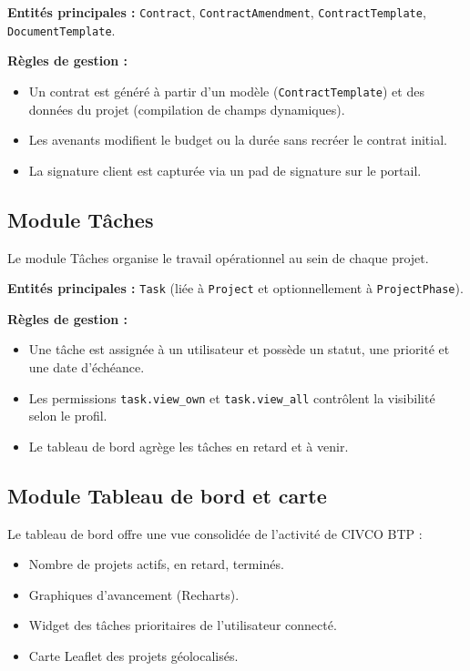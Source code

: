 \medskip

\textbf{Entités principales :} \texttt{Contract}, \texttt{ContractAmendment},
\texttt{ContractTemplate}, \texttt{DocumentTemplate}.

\medskip

\textbf{Règles de gestion :}
\begin{itemize}
  \item Un contrat est généré à partir d'un modèle (\texttt{ContractTemplate}) et
  des données du projet (compilation de champs dynamiques).
  \item Les avenants modifient le budget ou la durée sans recréer le contrat initial.
  \item La signature client est capturée via un pad de signature sur le portail.
\end{itemize}

\subsection{Module Tâches}

Le module Tâches organise le travail opérationnel au sein de chaque projet.

\medskip

\textbf{Entités principales :} \texttt{Task} (liée à \texttt{Project} et optionnellement
à \texttt{ProjectPhase}).

\medskip

\textbf{Règles de gestion :}
\begin{itemize}
  \item Une tâche est assignée à un utilisateur et possède un statut, une priorité
  et une date d'échéance.
  \item Les permissions \texttt{task.view\_own} et \texttt{task.view\_all} contrôlent
  la visibilité selon le profil.
  \item Le tableau de bord agrège les tâches en retard et à venir.
\end{itemize}

\subsection{Module Tableau de bord et carte}

Le tableau de bord offre une vue consolidée de l'activité de CIVCO BTP :

\begin{itemize}
  \item Nombre de projets actifs, en retard, terminés.
  \item Graphiques d'avancement (Recharts).
  \item Widget des tâches prioritaires de l'utilisateur connecté.
  \item Carte Leaflet des projets géolocalisés.
\end{itemize}

